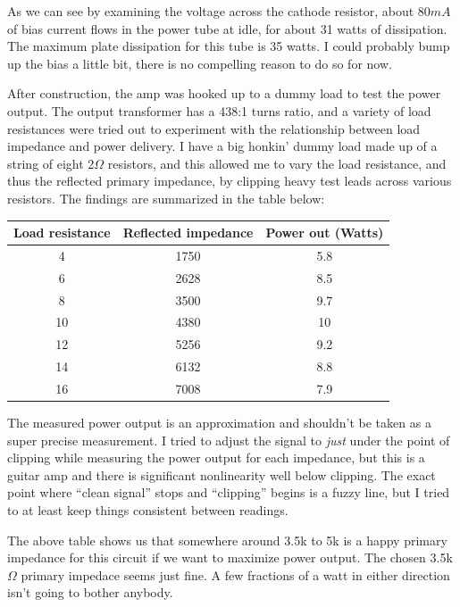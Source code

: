 \documentclass[pdftex,letterpaper,11pt]{article}
\begin{document}
As we can see by examining the voltage across the cathode resistor, about $80mA$ of bias current flows in the power tube at idle, for about 31 watts of dissipation. The maximum plate dissipation for this tube is 35 watts. I could probably bump up the bias a little bit, there is no compelling reason to do so for now.

\vspace{5mm}

After construction, the amp was hooked up to a dummy load to test the power output. The output transformer has a 438:1 turns ratio, and a variety of load resistances were tried out to experiment with the relationship between load impedance and power delivery. I have a big honkin' dummy load made up of a string of eight 2$\Omega$ resistors, and this allowed me to vary the load resistance, and thus the reflected primary impedance, by clipping heavy test leads across various resistors. The findings are summarized in the table below:

\begin{table}[H]
\centering
\begin{tabular}{ c | c | c }
    Load resistance  & Reflected impedance & Power out (Watts)  \\ \hline \hline
	4 & 1750 & 5.8 \\ \hline
	6 & 2628 & 8.5 \\ \hline
	8 & 3500 & 9.7 \\ \hline
	10 & 4380 & 10 \\ \hline
	12 & 5256 & 9.2 \\ \hline
	14 & 6132 & 8.8 \\ \hline
	16 & 7008 & 7.9 \\ \hline
\end{tabular}
\end{table}

The measured power output is an approximation and shouldn't be taken as a super precise measurement. I tried to adjust the signal to \textit{just} under the point of clipping while measuring the power output for each impedance, but this is a guitar amp and there is significant nonlinearity well below clipping. The exact point where ``clean signal'' stops and ``clipping'' begins is a fuzzy line, but I tried to at least keep things consistent between readings. 

\vspace{5mm}

The above table shows us that somewhere around 3.5k to 5k is a happy primary impedance for this circuit if we want to maximize power output. The chosen 3.5k$\Omega$ primary impedace seems just fine. A few fractions of a watt in either direction isn't going to bother anybody.
\end{document}
